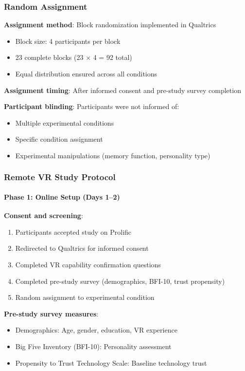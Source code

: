 \documentclass[12pt]{article}
\begin{document}
\subsubsection{Random Assignment}

\textbf{Assignment method}: Block randomization implemented in Qualtrics
\begin{itemize}
    \item Block size: 4 participants per block
    \item 23 complete blocks (23 $\times$ 4 = 92 total)
    \item Equal distribution ensured across all conditions
\end{itemize}

\textbf{Assignment timing}: After informed consent and pre-study survey completion

\textbf{Participant blinding}: Participants were not informed of:
\begin{itemize}
    \item Multiple experimental conditions
    \item Specific condition assignment
    \item Experimental manipulations (memory function, personality type)
\end{itemize}

\subsubsection{Remote VR Study Protocol}

\paragraph{Phase 1: Online Setup (Days 1--2)}

\textbf{Consent and screening}:
\begin{enumerate}
    \item Participants accepted study on Prolific
    \item Redirected to Qualtrics for informed consent
    \item Completed VR capability confirmation questions
    \item Completed pre-study survey (demographics, BFI-10, trust propensity)
    \item Random assignment to experimental condition
\end{enumerate}

\textbf{Pre-study survey measures}:
\begin{itemize}
    \item Demographics: Age, gender, education, VR experience
    \item Big Five Inventory (BFI-10): Personality assessment
    \item Propensity to Trust Technology Scale: Baseline technology trust
\end{itemize}
\end{document}
